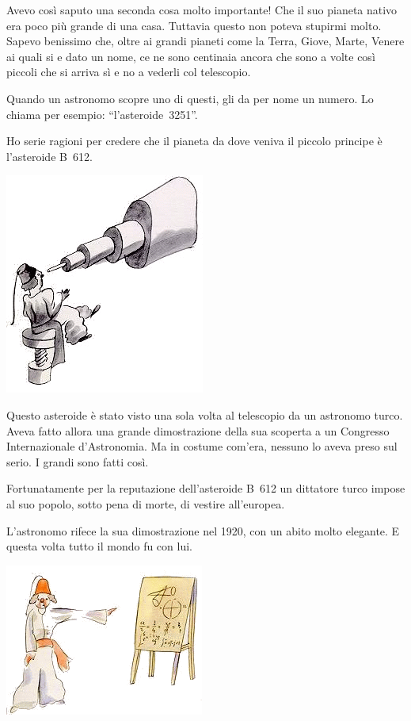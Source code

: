 \documentclass[11pt]{scrbook}
\begin{document}
Avevo così saputo una seconda cosa molto importante! Che il suo pianeta nativo era poco più grande di una casa. Tuttavia questo non poteva stupirmi molto. Sapevo benissimo che, oltre ai grandi pianeti come la Terra, Giove, Marte, Venere ai quali si e dato un nome, ce ne sono centinaia ancora che sono a volte così piccoli che si arriva sì e no a vederli col telescopio.

Quando un astronomo scopre uno di questi, gli da per nome un numero. Lo chiama per esempio: ``l'asteroide~3251''.

Ho serie ragioni per credere che il pianeta da dove veniva il piccolo principe è l'asteroide B~612.

\begin{center}
\includegraphics{img/4b}
\end{center}

Questo asteroide è stato visto una sola volta al telescopio da un astronomo turco. Aveva fatto allora una grande dimostrazione della sua scoperta a un Congresso Internazionale d'Astronomia. Ma in costume com'era, nessuno lo aveva preso sul serio. I grandi sono fatti così.

Fortunatamente per la reputazione dell'asteroide B~612 un dittatore turco impose al suo popolo, sotto pena di morte, di vestire all'europea.

L'astronomo rifece la sua dimostrazione nel 1920, con un abito molto elegante. E questa volta tutto il mondo fu con lui.

\begin{center}
\includegraphics{img/4c}
\end{center}
\end{document}
